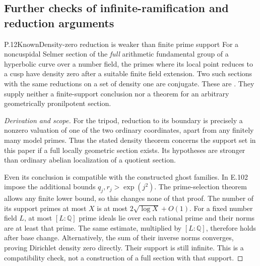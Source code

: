 \subsection{Further checks of infinite-ramification and reduction arguments}

\begin{result}{P.12}{Known}{Density-zero reduction is weaker than finite prime support}
For a noncuspidal Selmer section of the \emph{full} arithmetic fundamental
group of a hyperbolic curve over a number field, the primes where its local
point reduces to a cusp have density zero after a suitable finite field
extension. Two such sections with the same reductions on a set of density
one are conjugate. These are
\citet[Theorems~1.1--1.2, pp.1--2; Theorem~5.4 and Corollary~5.7,
pp.14--15]{RootPorowski2025}.
They supply neither a finite-support conclusion nor a theorem for an
arbitrary geometrically pronilpotent section.
\end{result}
\begin{proof}[Derivation and scope]
For the tripod, reduction to its boundary is precisely a nonzero valuation
of one of the two ordinary coordinates, apart from any finitely many
model primes. Thus the stated density theorem concerns the support set
in this paper if a full locally geometric section exists. Its hypotheses
are stronger than ordinary abelian localization of a quotient section.

Even its conclusion is compatible with the constructed ghost families.
In E.102 impose the additional bounds
\(q_j,r_j>\exp(j^2)\). The prime-selection theorem allows any finite
lower bound, so this changes none of that proof. The number of its
support primes at most \(X\) is at most \(2\sqrt{\log X}+O(1)\).
For a fixed number field \(L\), at most \([L:\mathbb Q]\) prime ideals
lie over each rational prime and their norms are at least that prime.
The same estimate, multiplied by \([L:\mathbb Q]\), therefore holds
after base change. Alternatively, the sum of their inverse norms
converges, proving Dirichlet density zero directly. Their support is
still infinite. This is a compatibility check, not a construction of
a full section with that support.
\end{proof}


